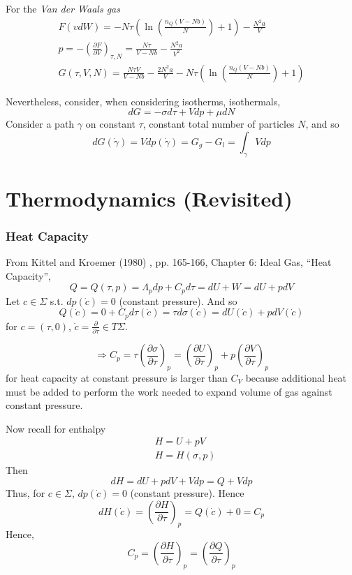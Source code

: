 \documentclass[10pt]{amsart}
\begin{document}
\begin{multicols*}{2}
For the \emph{Van der Waals gas}
\[
\begin{gathered}
  F(vdW) = -N\tau \left( \ln{ \left( \frac{n_Q (V-Nb)}{N} \right) }  + 1 \right) - \frac{N^2 a }{V} \\ 
  p = -\left( \frac{\partial F}{ \partial V} \right)_{\tau,N} = \frac{N\tau}{V-Nb} - \frac{N^2a}{V^2} \\
  G(\tau,V,N) = \frac{N\tau V}{ V-Nb} - \frac{2N^2 a}{V} - N\tau ( \ln{ \left( \frac{n_Q (V-Nb)}{N} \right) } + 1 )
\end{gathered}
\]

Nevertheless, consider, when considering isotherms, isothermals, 
\[
dG = -\sigma d\tau  + Vdp + \mu dN
\]
Consider a path $\gamma$ on constant $\tau$, constant total number of particles $N$, and so
\[
dG(\dot{\gamma}) = Vdp(\dot{\gamma}) = G_g-G_l = \int_{\gamma} Vdp
\]


\part{Thermodynamics (Revisited)}

\section{Heat Capacity}

From Kittel and Kroemer (1980) \cite{CKittelHKroemer1980}, pp. 165-166, Chapter 6: Ideal Gas, ``Heat Capacity'',
\[
Q = Q(\tau,p) = \Lambda_p dp + C_p d\tau = dU + W = dU + p dV 
\]
Let $c\in \Sigma$ s.t. $dp(\dot{c})=0$ (constant pressure).  And so 
\[
Q(\dot{c}) = 0 + C_p d\tau(\dot{c}) = \tau d\sigma (\dot{c}) = dU(\dot{c}) + pdV(\dot{c})
\]
for $c=(\tau,0)$, $\dot{c} = \frac{\partial }{ \partial \tau} \in T\Sigma$.  

\[
\Longrightarrow C_p = \tau \left( \frac{ \partial \sigma }{ \partial \tau} \right)_p = \left( \frac{ \partial U}{ \partial \tau} \right)_p + p \left( \frac{ \partial V}{ \partial \tau} \right)_p
\]
for heat capacity at constant pressure is larger than $C_V$ because additional heat must be added to perform the work needed to expand volume of gas against constant pressure.  

Now recall for enthalpy 
\[
\begin{aligned}
  & H = U+ pV \\ 
  & H = H(\sigma, p)
\end{aligned}
\]
Then
\[
dH = dU+ pdV + Vdp = Q + Vdp 
\]
Thus, for $c\in \Sigma$, $dp(\dot{c})=0$ (constant pressure).  Hence
\[
dH(\dot{c}) = \left( \frac{ \partial H}{ \partial \tau} \right)_p = Q(\dot{c})  +  0 = C_p
\]
Hence, 
\[
C_p = \left( \frac{ \partial H}{ \partial \tau } \right)_p = \left( \frac{ \partial Q}{ \partial \tau} \right)_p
\]




\end{multicols*}
\end{document}
